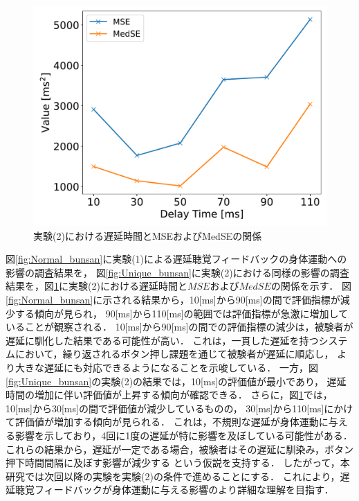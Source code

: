 \begin{figure}[bt]
  \centering
  \includegraphics[scale=0.5]{figures/Yobi/Var/Yobi-MSE-MedSE.pdf}
  \caption{実験(2)における遅延時間とMSEおよびMedSEの関係}
  \label{fig:Yobi_MSE_MedSE}
\end{figure}
図\ref{fig:Normal_bunsan}に実験(1)による遅延聴覚フィードバックの身体運動への影響の調査結果を，
図\ref{fig:Unique_bunsan}に実験(2)における同様の影響の調査結果を，図\ref{fig:Yobi_MSE_MedSE}に実験(2)における遅延時間と$MSE$および$MedSE$の関係を示す．
図\ref{fig:Normal_bunsan}に示される結果から，10[ms]から90[ms]の間で評価指標が減少する傾向が見られ，
90[ms]から110[ms]の範囲では評価指標が急激に増加していることが観察される．
10[ms]から90[ms]の間での評価指標の減少は，被験者が遅延に馴化した結果である可能性が高い．
これは，一貫した遅延を持つシステムにおいて，繰り返されるボタン押し課題を通じて被験者が遅延に順応し，
より大きな遅延にも対応できるようになることを示唆している．
一方，図\ref{fig:Unique_bunsan}の実験(2)の結果では，10[ms]の評価値が最小であり，
遅延時間の増加に伴い評価値が上昇する傾向が確認できる．
さらに，図\ref{fig:Yobi_MSE_MedSE}では，10[ms]から30[ms]の間で評価値が減少しているものの，
30[ms]から110[ms]にかけて評価値が増加する傾向が見られる．
これは，不規則な遅延が身体運動に与える影響を示しており，4回に1度の遅延が特に影響を及ぼしている可能性がある．
これらの結果から，遅延が一定である場合，被験者はその遅延に馴染み，ボタン押下時間間隔に及ぼす影響が減少する
という仮説を支持する．
したがって，本研究では次回以降の実験を実験(2)の条件で進めることにする．
これにより，遅延聴覚フィードバックが身体運動に与える影響のより詳細な理解を目指す．

\newpage \newpage
